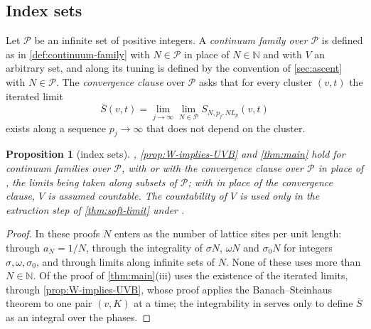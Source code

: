 \documentclass[11pt,a4paper]{amsart}
\newtheorem{proposition}[theorem]{Proposition}
\theoremstyle{definition}
\theoremstyle{remark}
\numberwithin{equation}{section}
\newcommand{\Nat}{\mathbb{N}}        %
\newcommand{\Mcirc}{\text{\upshape(M$^{\circ}$)}}   %
\newcommand{\hypW}{\text{\upshape(W)}}              %
\newcommand{\UVB}{\text{\upshape(UVB)}}             %
\newcommand{\aN}{a_N}                      %
\newcommand{\Lp}{L_p}                      %
\begin{document}
\subsection{Index sets}
Let $\mathcal P$ be an infinite set of positive integers. A \emph{continuum family over $\mathcal P$} is defined as in \cref{def:continuum-family} with $N\in\mathcal P$ in place of $N\in\Nat$ and with $V$ an arbitrary set, and \Mcirc{} along its tuning is defined by the convention of \cref{sec:ascent} with $N\in\mathcal P$. The \emph{convergence clause} over $\mathcal P$ asks that for every cluster $(v,t)$ the iterated limit
\begin{equation}\label{eq:conv-clause}
\bar S(v,t)=\lim_{j\to\infty}\lim_{N\in\mathcal P}S_{N,p_j,N\Lp}(v,t)
\end{equation}
exists along a sequence $p_j\to\infty$ that does not depend on the cluster.

\begin{proposition}[index sets]\label{prop:index-sets}
, \cref{prop:W-implies-UVB} and \cref{thm:main} hold for continuum families over $\mathcal P$, with \UVB{} or with the convergence clause over $\mathcal P$ in place of \hypW, the limits being taken along subsets of $\mathcal P$; with \UVB{} in place of the convergence clause, $V$ is assumed countable. The countability of $V$ is used only in the extraction step of \cref{thm:soft-limit} under \UVB.
\end{proposition}

\begin{proof}
In these proofs $N$ enters as the number of lattice sites per unit length: through $\aN=1/N$, through the integrality of $\sigma N$, $\omega N$ and $\sigma_0N$ for integers $\sigma,\omega,\sigma_0$, and through limits along infinite sets of $N$. None of these uses more than $N\in\Nat$. Of \hypW{} the proof of \cref{thm:main}(iii) uses the existence of the iterated limits, through \cref{prop:W-implies-UVB}, whose proof applies the Banach--Steinhaus theorem to one pair $(v,K)$ at a time; the integrability in \hypW{} serves only to define $\bar S$ as an integral over the phases.
\end{proof}
\end{document}
